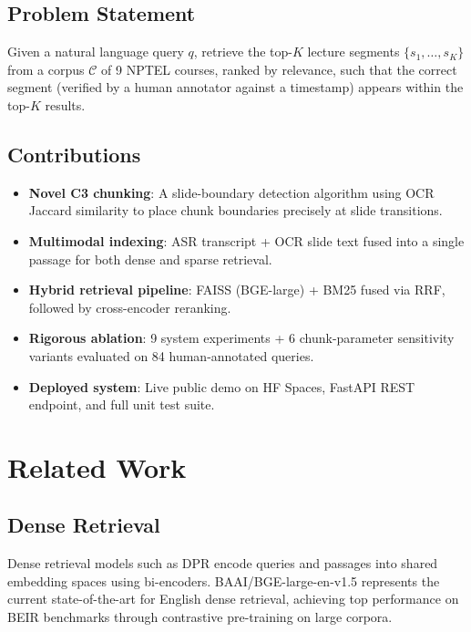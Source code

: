 \documentclass[12pt,a4paper]{article}
\begin{document}
\subsection{Problem Statement}

Given a natural language query $q$, retrieve the top-$K$ lecture segments $\{s_1, \ldots, s_K\}$ from a corpus $\mathcal{C}$ of 9 NPTEL courses, ranked by relevance, such that the correct segment (verified by a human annotator against a timestamp) appears within the top-$K$ results.

\subsection{Contributions}

\begin{itemize}[leftmargin=1.5em]
  \item \textbf{Novel C3 chunking}: A slide-boundary detection algorithm using OCR Jaccard similarity to place chunk boundaries precisely at slide transitions.
  \item \textbf{Multimodal indexing}: ASR transcript + OCR slide text fused into a single passage for both dense and sparse retrieval.
  \item \textbf{Hybrid retrieval pipeline}: FAISS (BGE-large) + BM25 fused via RRF, followed by cross-encoder reranking.
  \item \textbf{Rigorous ablation}: 9 system experiments + 6 chunk-parameter sensitivity variants evaluated on 84 human-annotated queries.
  \item \textbf{Deployed system}: Live public demo on HF Spaces, FastAPI REST endpoint, and full unit test suite.
\end{itemize}

\newpage
\section{Related Work}

\subsection{Dense Retrieval}
Dense retrieval models such as DPR \cite{karpukhin2020dpr} encode queries and passages into shared embedding spaces using bi-encoders. BAAI/BGE-large-en-v1.5 \cite{bge2023} represents the current state-of-the-art for English dense retrieval, achieving top performance on BEIR benchmarks through contrastive pre-training on large corpora.
\end{document}
